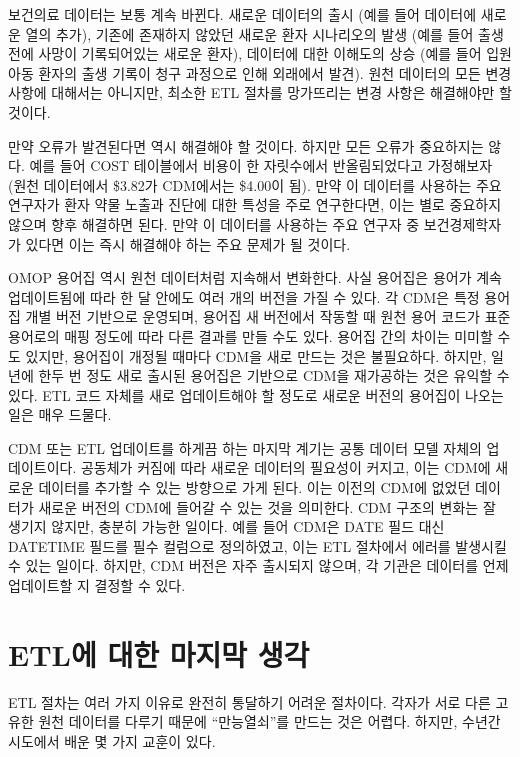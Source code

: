 \documentclass[10.5pt]{book}
\theoremstyle{definition}
\theoremstyle{definition}
\theoremstyle{definition}
\theoremstyle{remark}
\begin{document}
보건의료 데이터는 보통 계속 바뀐다. 새로운 데이터의 출시 (예를 들어
데이터에 새로운 열의 추가), 기존에 존재하지 않았던 새로운 환자
시나리오의 발생 (예를 들어 출생 전에 사망이 기록되어있는 새로운 환자),
데이터에 대한 이해도의 상승 (예를 들어 입원 아동 환자의 출생 기록이 청구
과정으로 인해 외래에서 발견). 원천 데이터의 모든 변경 사항에 대해서는
아니지만, 최소한 ETL 절차를 망가뜨리는 변경 사항은 해결해야만 할 것이다.

만약 오류가 발견된다면 역시 해결해야 할 것이다. 하지만 모든 오류가
중요하지는 않다. 예를 들어 COST 테이블에서 비용이 한 자릿수에서
반올림되었다고 가정해보자 (원천 데이터에서 \$3.82가 CDM에서는 \$4.00이
됨). 만약 이 데이터를 사용하는 주요 연구자가 환자 약물 노출과 진단에
대한 특성을 주로 연구한다면, 이는 별로 중요하지 않으며 향후 해결하면
된다. 만약 이 데이터를 사용하는 주요 연구자 중 보건경제학자가 있다면
이는 즉시 해결해야 하는 주요 문제가 될 것이다.

OMOP 용어집 역시 원천 데이터처럼 지속해서 변화한다. 사실 용어집은 용어가
계속 업데이트됨에 따라 한 달 안에도 여러 개의 버전을 가질 수 있다. 각
CDM은 특정 용어집 개별 버전 기반으로 운영되며, 용어집 새 버전에서 작동할
때 원천 용어 코드가 표준 용어로의 매핑 정도에 따라 다른 결과를 만들 수도
있다. 용어집 간의 차이는 미미할 수도 있지만, 용어집이 개정될 때마다
CDM을 새로 만드는 것은 불필요하다. 하지만, 일 년에 한두 번 정도 새로
출시된 용어집은 기반으로 CDM을 재가공하는 것은 유익할 수 있다. ETL 코드
자체를 새로 업데이트해야 할 정도로 새로운 버전의 용어집이 나오는 일은
매우 드물다.

CDM 또는 ETL 업데이트를 하게끔 하는 마지막 계기는 공통 데이터 모델
자체의 업데이트이다. 공동체가 커짐에 따라 새로운 데이터의 필요성이
커지고, 이는 CDM에 새로운 데이터를 추가할 수 있는 방향으로 가게 된다.
이는 이전의 CDM에 없었던 데이터가 새로운 버전의 CDM에 들어갈 수 있는
것을 의미한다. CDM 구조의 변화는 잘 생기지 않지만, 충분히 가능한 일이다.
예를 들어 CDM은 DATE 필드 대신 DATETIME 필드를 필수 컬럼으로 정의하였고,
이는 ETL 절차에서 에러를 발생시킬 수 있는 일이다. 하지만, CDM 버전은
자주 출시되지 않으며, 각 기관은 데이터를 언제 업데이트할 지 결정할 수
있다.

\section{ETL에 대한 마지막 생각}\label{etl---}

ETL 절차는 여러 가지 이유로 완전히 통달하기 어려운 절차이다. 각자가 서로
다른 고유한 원천 데이터를 다루기 때문에 ``만능열쇠''를 만드는 것은
어렵다. 하지만, 수년간 시도에서 배운 몇 가지 교훈이 있다.
\end{document}

